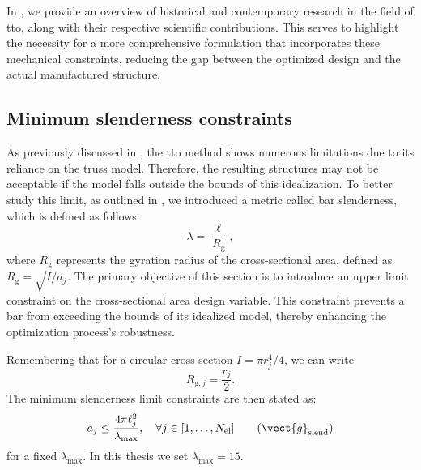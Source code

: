 In , we provide an overview of historical and contemporary research in the field of \gls{tto}, along with their respective scientific contributions. This serves to highlight the necessity for a more comprehensive formulation that incorporates these mechanical constraints, reducing the gap between the optimized design and the actual manufactured structure.
    
\subsection{Minimum slenderness constraints}
As previously discussed in , the \gls{tto} method shows numerous limitations due to its reliance on the truss model. Therefore, the resulting structures may not be acceptable if the model falls outside the bounds of this idealization. To better study this limit, as outlined in , we introduced a metric called bar slenderness, which is defined as follows:
\begin{equation}
    \lambda = \frac{\ell}{R_{\mathrm{g}}},
\end{equation}
where $R_{\mathrm{g}}$ represents the gyration radius of the cross-sectional area, defined as $R_{\mathrm{g}} = \sqrt{I/a_j}$.
The primary objective of this section is to introduce an upper limit constraint on the cross-sectional area design variable. This constraint prevents a bar from exceeding the bounds of its idealized model, thereby enhancing the optimization process's robustness.

Remembering that for a circular cross-section $I = \pi r_j^4/4$, we can write
\begin{equation}
    R_{\mathrm{g},j} = \frac{r_j}{2}.
\end{equation}
The minimum slenderness limit constraints are then stated as:
\begin{equation} \label{eq:04_slend_constraints}
    a_j \leq \frac{4 \pi \ell_j^2}{\lambda_{\text{max}}}, \quad \forall j \in [1,\ldots, N_{\text{el}}]
    \tag{$\vect{g}_{\text{slend}}$}
\end{equation}
for a fixed $\lambda_{\text{max}}$. In this thesis we set $\lambda_{\text{max}}=15$.

